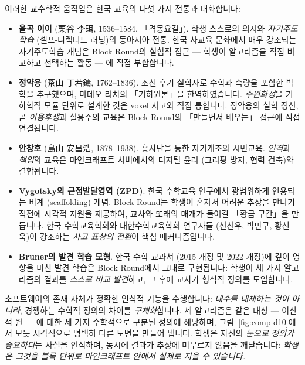 \documentclass[12pt,a4paper]{scrartcl}
\newcommand{\acc}[1]{\textcolor{accent}{\textbf{#1}}}
\begin{document}
이러한 교수학적 움직임은 한국 교육의 다섯 가지 전통과 대화합니다:

\begin{itemize}[leftmargin=1.3em,itemsep=0.2em,topsep=0.3em]
  \item \acc{율곡 이이} (栗谷 李珥, 1536--1584, 「격몽요결」). 학생 스스로의 의지와 \emph{자기주도학습} (셀프-디렉티드 러닝)의 동아시아 전통. 한국 사교육 문화에서 매우 강조되는 자기주도학습 개념은 Block Round의 실험적 접근 — 학생이 알고리즘을 직접 비교하고 선택하는 활동 — 에 직접 부합합니다.

  \item \acc{정약용} (茶山 丁若鏞, 1762--1836). 조선 후기 실학자로 수학과 측량을 포함한 박학을 추구했으며, 마테오 리치의 「기하원본」을 한역하였습니다. \emph{수원화성}을 기하학적 모듈 단위로 설계한 것은 voxel 사고와 직접 통합니다. 정약용의 실학 정신, 곧 \emph{이용후생}과 실용주의 교육은 Block Round의 「만들면서 배우는」 접근에 직접 연결됩니다.

  \item \acc{안창호} (島山 安昌浩, 1878--1938). 흥사단을 통한 자기개조와 시민교육. \emph{인격}과 \emph{책임}의 교육은 마인크래프트 서버에서의 디지털 윤리 (그리핑 방지, 협력 건축)와 결합됩니다.

  \item \acc{Vygotsky의 근접발달영역 (ZPD)}. 한국 수학교육 연구에서 광범위하게 인용되는 비계 (scaffolding) 개념. Block Round는 학생이 혼자서 어려운 추상을 만나기 직전에 시각적 지원을 제공하여, 교사와 또래의 매개가 들어갈 「황금 구간」을 만듭니다. 한국 수학교육학회와 대한수학교육학회 연구자들 (신선우, 박만구, 황선욱)이 강조하는 \emph{사고 표상의 전환}이 핵심 메커니즘입니다.

  \item \acc{Bruner의 발견 학습 모형}. 한국 수학 교과서 (2015 개정 및 2022 개정)에 깊이 영향을 미친 발견 학습은 Block Round에서 그대로 구현됩니다: 학생이 세 가지 알고리즘의 결과를 \emph{스스로 비교 발견}하고, 그 후에 교사가 형식적 정의를 도입합니다.
\end{itemize}

소프트웨어의 존재 자체가 정확한 인식적 기능을 수행합니다: \emph{대수를 대체하는 것이 아니라}, 경쟁하는 수학적 정의의 차이를 \emph{구체화}합니다. 세 알고리즘은 같은 대상 — 이산적 원 — 에 대한 세 가지 수학적으로 구분된 정의에 해당하며, 그림~\ref{fig:comp-d10}에서 보듯 시각적으로 명백히 다른 도면을 만들어 냅니다. 학생은 자신의 \emph{눈으로} \emph{정의가 중요하다}는 사실을 인식하며, 동시에 결과가 추상에 머무르지 않음을 깨닫습니다: \emph{학생은 그것을 블록 단위로 마인크래프트 안에서 실제로 지을 수 있습니다.}
\end{document}
